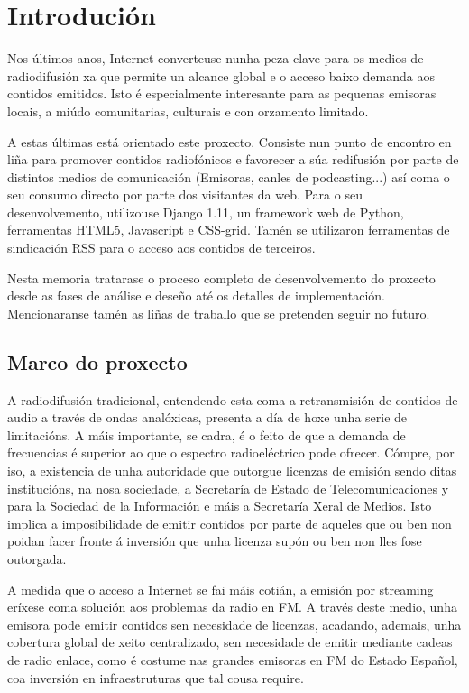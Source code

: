 \chapter[Introdución]{
  \label{chp:introduccion}
  Introdución
}
\minitoc
\newpage

Nos últimos anos, Internet converteuse nunha peza clave para os medios de radiodifusión xa que permite un alcance global e o acceso baixo demanda aos contidos emitidos. Isto é especialmente interesante para as pequenas emisoras locais, a miúdo comunitarias, culturais e con orzamento limitado.

A estas últimas está orientado este proxecto. Consiste nun punto de encontro en liña para promover contidos radiofónicos e favorecer a súa redifusión por parte de distintos medios de comunicación (Emisoras, canles de podcasting...) así coma o seu consumo directo por parte dos visitantes da web. Para o seu desenvolvemento, utilizouse Django 1.11, un framework web de Python, ferramentas HTML5, Javascript e CSS-grid. Tamén se utilizaron ferramentas de sindicación RSS para o acceso aos contidos de terceiros.

Nesta memoria tratarase o proceso completo de desenvolvemento do proxecto desde as fases de análise e deseño até os detalles de implementación. Mencionaranse tamén as liñas de traballo que se pretenden seguir no futuro.

\section{Marco do proxecto}


A radiodifusión tradicional, entendendo esta coma a retransmisión de contidos de audio a través de ondas analóxicas, presenta a día de hoxe unha serie de limitacións. A máis importante, se cadra, é o feito de que a demanda de frecuencias é superior ao que o espectro radioeléctrico pode ofrecer. Cómpre, por iso, a existencia de unha autoridade que outorgue licenzas de emisión sendo ditas institucións, na nosa sociedade, a Secretaría de Estado de Telecomunicaciones y para la Sociedad de la Información e máis a Secretaría Xeral de Medios\cite{BOE}. Isto implica a imposibilidade de emitir contidos por parte de aqueles que ou ben non poidan facer fronte á inversión que unha licenza supón ou ben non lles fose outorgada.

A medida que o acceso a Internet se fai máis cotián, a emisión por streaming eríxese coma solución aos problemas da radio en FM. A través deste medio, unha emisora pode emitir contidos sen necesidade de licenzas, acadando, ademais, unha cobertura global de xeito centralizado, sen necesidade de emitir mediante cadeas de radio enlace, como é costume nas grandes emisoras en FM do Estado Español, coa inversión en infraestruturas que tal cousa require.

